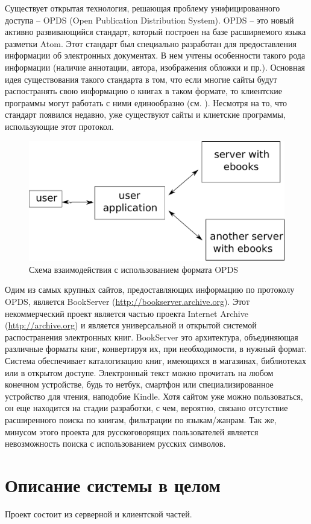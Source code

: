 Существует открытая технология, решающая проблему унифицированного доступа  -- OPDS (Open Publication Distribution System).
OPDS -- это новый активно развивающийся стандарт, который построен на базе расширяемого языка разметки Atom. Этот стандарт был специально разработан для предоставления информации об электронных документах. В нем учтены особенности такого рода информации (наличие аннотации, автора, изображения обложки и пр.).
Основная идея существования такого стандарта в том, что если многие сайты будут распостранять свою информацию о книгах в таком формате, то клиентские программы могут работать с ними единообразно (см. ). Несмотря на то, что стандарт появился недавно, уже существуют сайты и клиетские программы, использующие этот протокол. 

\begin{figure}
\centering
\includegraphics[width=.5\textwidth]{scheme}
\caption{Схема взаимодействия с использованием формата OPDS}\label{fig:scheme}
\end{figure}

Одим из самых крупных сайтов, предоставляющих информацию по протоколу OPDS, является BookServer (\url{http://bookserver.archive.org}).
Этот некоммерческий проект является частью проекта Internet Archive (\url{http://archive.org}) и является универсальной и открытой системой распостранения электронных книг. BookServer это архитектура, объединяющая различные форматы книг, конвертируя их, при необходимости, в нужный формат. Система обеспечивает каталогизацию книг, имеющихся в магазинах, библиотеках или в открытом доступе. Электронный текст можно прочитать на любом конечном устройстве, будь то нетбук, смартфон или специализированное устройство для чтения, наподобие Kindle. Хотя сайтом уже можно пользоваться, он еще находится на стадии разработки, с чем, вероятно, связано отсутствие расширенного поиска по книгам, фильтрации по языкам/жанрам. Так же, минусом этого проекта для русскоговорящих пользователей является невозможность поиска с использованием русских символов.

\section{Описание системы в целом}
Проект состоит из серверной и клиентской частей.

